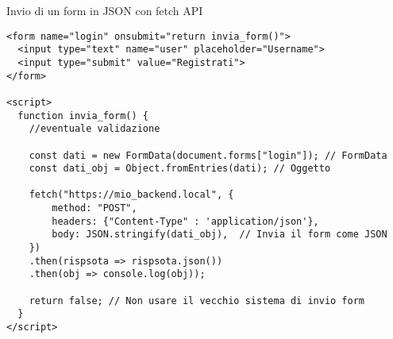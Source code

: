 \begin{frame}[fragile]{Invio di un form in JSON con fetch API}\transfade\centering
  \begin{verbatim}
<form name="login" onsubmit="return invia_form()">
  <input type="text" name="user" placeholder="Username">
  <input type="submit" value="Registrati">
</form>

<script>
  function invia_form() {
    //eventuale validazione

    const dati = new FormData(document.forms["login"]); // FormData
    const dati_obj = Object.fromEntries(dati); // Oggetto

    fetch("https://mio_backend.local", {
        method: "POST",
        headers: {"Content-Type" : 'application/json'},
        body: JSON.stringify(dati_obj),  // Invia il form come JSON
    })
    .then(rispsota => rispsota.json())
    .then(obj => console.log(obj));

    return false; // Non usare il vecchio sistema di invio form
  }
</script>
  \end{verbatim}
\end{frame}
